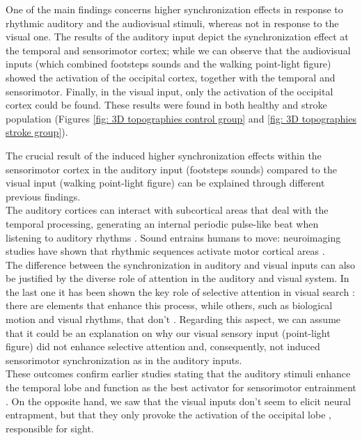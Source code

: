 One of the main findings concerns higher synchronization effects in response to rhythmic auditory and the audiovisual stimuli, whereas not in response to the visual one. The results of the auditory input depict the synchronization effect at the temporal and sensorimotor cortex; while we can observe that the audiovisual inputs (which combined footsteps sounds and the walking point-light figure) showed the activation of the occipital cortex, together with the temporal and sensorimotor. Finally, in the visual input, only the activation of the occipital cortex could be found. These results were found in both healthy and stroke population (Figures \ref{fig: 3D topographies control group} and \ref{fig: 3D topographies stroke group}).

The crucial result of the induced higher synchronization effects within the sensorimotor cortex in the auditory input (footsteps sounds) compared to the visual input (walking point-light figure) can be explained through different previous findings. \\
The auditory cortices can interact with subcortical areas that deal with the temporal processing, generating an internal periodic pulse-like beat when listening to auditory rhythms \parencite{Nozaradan_2017}. Sound entrains humans to move: neuroimaging studies have shown that rhythmic sequences activate motor cortical areas \parencite{Grahn_2007}. \\
The difference between the synchronization in auditory and visual inputs can also be justified by the diverse role of attention in the auditory and visual system. In the last one it has been shown the key role of selective attention in visual search \parencite{Keshvari_2016}: there are elements that enhance this process, while others, such as biological motion and visual rhythms, that don't \parencite{Wolfe_2017}. Regarding this aspect, we can assume that it could be an explanation on why our visual sensory input (point-light figure) did not enhance selective attention and, consequently, not induced sensorimotor synchronization as in the auditory inputs. \\
These outcomes confirm earlier studies stating that the auditory stimuli enhance the temporal lobe and function as the best activator for sensorimotor entrainment \parencite{Thaut_1999}. On the opposite hand, we saw that the visual inputs don't seem to elicit neural entrapment, but that they only provoke the activation of the occipital lobe \parencite{Nehmad_1998}, responsible for sight. 

